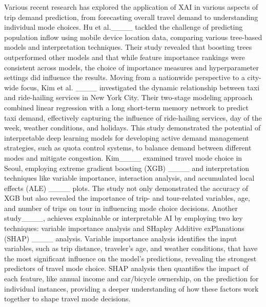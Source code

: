 Various recent research has explored the application of XAI in various aspects of trip demand prediction, from forecasting overall travel demand to understanding individual mode choices. Hu et al.____ tackled the challenge of predicting population inflow using mobile device location data, comparing various tree-based models and interpretation techniques. Their study revealed that boosting trees outperformed other models and that while feature importance rankings were consistent across models, the choice of importance measures and hyperparameter settings did influence the results. Moving from a nationwide perspective to a city-wide focus, Kim et al. ____ investigated the dynamic relationship between taxi and ride-hailing services in New York City. Their two-stage modeling approach combined linear regression with a long short-term memory network to predict taxi demand, effectively capturing the influence of ride-hailing services, day of the week, weather conditions, and holidays. This study demonstrated the potential of interpretable deep learning models for developing active demand management strategies, such as quota control systems, to balance demand between different modes and mitigate congestion. Kim____ examined travel mode choice in Seoul, employing extreme gradient boosting (XGB) ____ and interpretation techniques like variable importance, interaction analysis, and accumulated local eﬀects (ALE) ____ plots. The study not only demonstrated the accuracy of XGB but also revealed the importance of trip- and tour-related variables, age, and number of trips on tour in influencing mode choice decisions. Another study____, achieves explainable or interpretable AI by employing two key techniques: variable importance analysis and SHapley Additive exPlanations (SHAP) ____ analysis. Variable importance analysis identifies the input variables, such as trip distance, traveler’s age, and weather conditions, that have the most significant influence on the model's predictions, revealing the strongest predictors of travel mode choice. SHAP analysis then quantifies the impact of each feature, like annual income and car/bicycle ownership, on the prediction for individual instances, providing a deeper understanding of how these factors work together to shape travel mode decisions.


